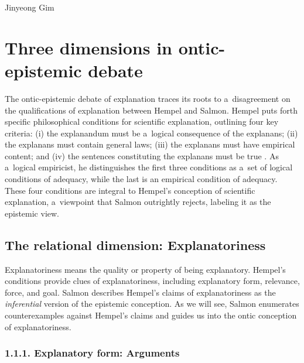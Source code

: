 \begin{artengenv}{Jinyeong Gim}
\section{Three dimensions in ontic-epistemic debate}
The ontic-epistemic debate of explanation traces its roots to a~disagreement on the qualifications of explanation between Hempel and Salmon. Hempel puts forth specific philosophical conditions for scientific explanation, outlining four key criteria: (i) the explanandum must be a~logical consequence of the explanans; (ii) the explanans must contain general laws; (iii) the explanans must have empirical content; and (iv) the sentences constituting the explanans must be true
\parencites[][pp.247–249]{hempel_aspects_1965}[][pp.137–138]{hempel_studies_1948}. %
 As a~logical empiricist, he distinguishes the first three conditions as a~set of logical conditions of adequacy, while the last is an empirical condition of adequacy. These four conditions are integral to Hempel's conception of scientific explanation, a~viewpoint that Salmon outrightly rejects, labeling it as the epistemic view.

\subsection{The relational dimension: Explanatoriness}

Explanatoriness means the quality or property of being explanatory. Hempel's conditions provide clues of explanatoriness, including explanatory form, relevance, force, and goal. Salmon
\parencite*[][p.84]{salmon_scientific_1984} %
 describes Hempel's claims of explanatoriness as the \textit{inferential} version of the epistemic conception. As we will see, Salmon 
\parencite*[][]{salmon_four_1989} %
 enumerates counterexamples against Hempel's claims and guides us into the ontic conception of explanatoriness.

\subsubsection{1.1.1. Explanatory form: Arguments}


\end{artengenv}
